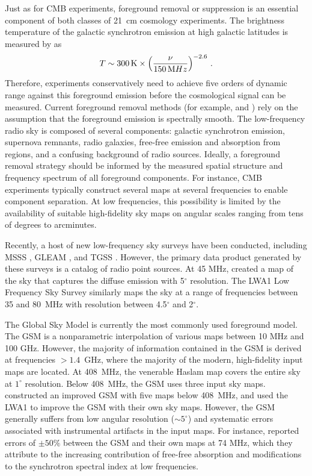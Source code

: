 \begin{bibunit}
Just as for CMB experiments, foreground removal or suppression is an essential component of both
classes of 21~cm cosmology experiments. The brightness temperature of the galactic synchrotron
emission at high galactic latitudes is measured by \citet{2017MNRAS.464.4995M} as
\begin{equation}
    T \sim 300\,{\rm K} \times \left(\frac{\nu}{150\,{\rm MHz}}\right)^{-2.6}\,.
\end{equation}
Therefore, experiments conservatively need to achieve five orders of dynamic range against this
foreground emission before the cosmological signal can be measured. Current foreground removal
methods (for example, \citealt{2012ApJ...756..165P} and \citealt{2013MNRAS.429..165C}) rely on the
assumption that the foreground emission is spectrally smooth. The low-frequency radio sky is
composed of several components: galactic synchrotron emission, supernova remnants, radio galaxies,
free-free emission and absorption from  regions, and a confusing background of radio
sources.  Ideally, a foreground removal strategy should be informed by the measured spatial
structure and frequency spectrum of all foreground components. For instance, CMB experiments
typically construct several maps at several frequencies to enable component separation.  At low
frequencies, this possibility is limited by the availability of suitable high-fidelity sky maps on
angular scales ranging from tens of degrees to arcminutes.

Recently, a host of new low-frequency sky surveys have been conducted, including MSSS
\citep{2015A&A...582A.123H}, GLEAM \citep{2015PASA...32...25W}, and TGSS
\citep{2017A&A...598A..78I}. However, the primary data product generated by these surveys is a
catalog of radio point sources. At 45 MHz, \citet{2011A&A...525A.138G} created a map of the sky that
captures the diffuse emission with 5$^\circ$ resolution.  The LWA1 Low Frequency Sky Survey
\citep[LLFSS;][]{2017MNRAS.469.4537D} similarly maps the sky at a range of frequencies between
35 and 80~MHz with resolution between 4.5$^\circ$ and 2$^\circ$.

The Global Sky Model \citep[GSM;][]{2008MNRAS.388..247D} is currently the most commonly used
foreground model. The GSM is a nonparametric interpolation of various maps between 10 MHz and 100
GHz. However, the majority of information contained in the GSM is derived at frequencies $>1.4$~GHz,
where the majority of the modern, high-fidelity input maps are located. At 408~MHz, the venerable
Haslam map \citep{1981A&A...100..209H, 1982A&AS...47....1H} covers the entire sky at $1^\circ$
resolution.  Below 408~MHz, the GSM uses three input sky maps. \citet{2017MNRAS.464.3486Z}
constructed an improved GSM with five maps below 408~MHz, and \citet{2017MNRAS.469.4537D} used the
LWA1 to improve the GSM with their own sky maps.  However, the GSM generally suffers from low
angular resolution ($\sim 5^\circ$) and systematic errors associated with instrumental artifacts in
the input maps.  For instance, \citet{2017MNRAS.469.4537D} reported errors of $\pm 50\%$ between the
GSM and their own maps at 74 MHz, which they attribute to the increasing contribution of free-free
absorption and modifications to the synchrotron spectral index at low frequencies.


\end{bibunit}

